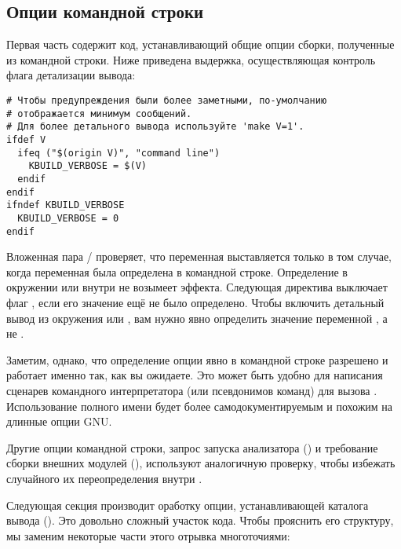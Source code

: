 \subsection{Опции командной строки}
Первая часть  содержит код, устанавливающий общие опции
сборки, полученные из командной строки. Ниже приведена выдержка,
осуществляющая контроль флага детализации вывода:

\begin{verbatim}
# Чтобы предупреждения были более заметными, по-умолчанию
# отображается минимум сообщений.
# Для более детального вывода используйте 'make V=1'.
ifdef V
  ifeq ("$(origin V)", "command line")
    KBUILD_VERBOSE = $(V)
  endif
endif
ifndef KBUILD_VERBOSE
  KBUILD_VERBOSE = 0
endif
\end{verbatim}

Вложенная пара / проверяет, что
переменная  выставляется только в том
случае, когда переменная  была определена в командной
строке. Определение  в окружении или внутри 
не возымеет эффекта. Следующая директива  выключает
флаг , если его значение ещё не было
определено. Чтобы включить детальный вывод из окружения или
, вам нужно явно определить значение переменной
, а не .

Заметим, однако, что определение опции  явно
в командной строке разрешено и работает именно так, как вы
ожидаете. Это может быть удобно для написания сценарев командного
интерпретатора (или псевдонимов команд) для вызова
. Использование полного имени будет более
самодокументируемым и похожим на длинные опции GNU.

Другие опции командной строки, запрос запуска анализатора
 () и требование сборки внешних модулей
(), используют аналогичную проверку, чтобы избежать
случайного их переопределения внутри .

Следующая секция  производит оработку опции,
устанавливающей каталога вывода (). Это довольно сложный
участок кода. Чтобы прояснить его структуру, мы заменим некоторые
части этого отрывка многоточиями:


